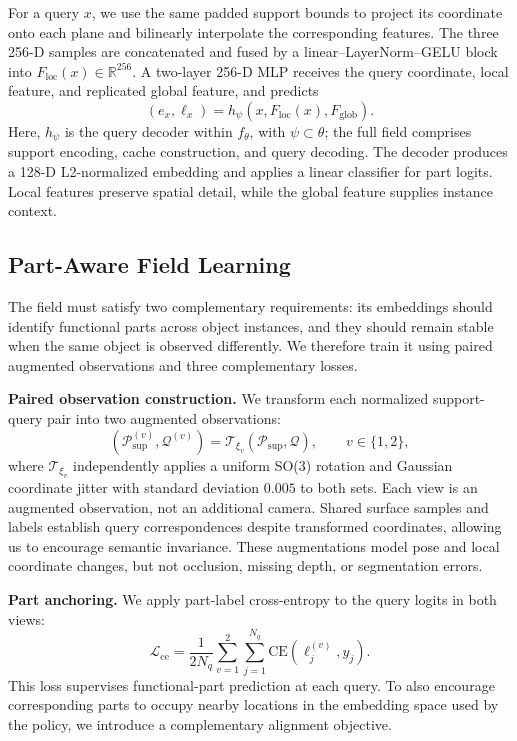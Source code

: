 For a query $x$, we use the same padded support bounds to project its coordinate onto each plane and bilinearly interpolate the corresponding features. The three 256-D samples are concatenated and fused by a linear--LayerNorm--GELU block into $F_{\mathrm{loc}}(x)\in\mathbb{R}^{256}$. A two-layer 256-D MLP receives the query coordinate, local feature, and replicated global feature, and predicts
\begin{equation}
    (e_x,\ell_x)=h_{\psi}\!\left(x,F_{\mathrm{loc}}(x),F_{\mathrm{glob}}\right).
    \label{eq:query_decoder}
\end{equation}
Here, $h_{\psi}$ is the query decoder within $f_{\theta}$, with $\psi\subset\theta$; the full field comprises support encoding, cache construction, and query decoding. The decoder produces a 128-D L2-normalized embedding and applies a linear classifier for part logits. Local features preserve spatial detail, while the global feature supplies instance context.


\subsection{Part-Aware Field Learning}
\label{sec:objectives}

The field must satisfy two complementary requirements: its embeddings should identify functional parts across object instances, and they should remain stable when the same object is observed differently. We therefore train it using paired augmented observations and three complementary losses.

\textbf{Paired observation construction.}
We transform each normalized support-query pair into two augmented observations:
\begin{equation}
    (\mathcal{P}_{\mathrm{sup}}^{(v)},\mathcal{Q}^{(v)})
    =\mathcal{T}_{\xi_v}(\mathcal{P}_{\mathrm{sup}},\mathcal{Q}),
    \qquad v\in\{1,2\},
    \label{eq:augmented_views}
\end{equation}
where $\mathcal{T}_{\xi_v}$ independently applies a uniform SO(3) rotation and Gaussian coordinate jitter with standard deviation $0.005$ to both sets. Each view is an augmented observation, not an additional camera. Shared surface samples and labels establish query correspondences despite transformed coordinates, allowing us to encourage semantic invariance. These augmentations model pose and local coordinate changes, but not occlusion, missing depth, or segmentation errors.

\textbf{Part anchoring.}
We apply part-label cross-entropy to the query logits in both views:
\begin{equation}
    \mathcal{L}_{\mathrm{ce}}
    =\frac{1}{2N_q}\sum_{v=1}^{2}\sum_{j=1}^{N_q}
    \mathrm{CE}(\ell_j^{(v)},y_j).
    \label{eq:part_loss}
\end{equation}
This loss supervises functional-part prediction at each query. To also encourage corresponding parts to occupy nearby locations in the embedding space used by the policy, we introduce a complementary alignment objective.

